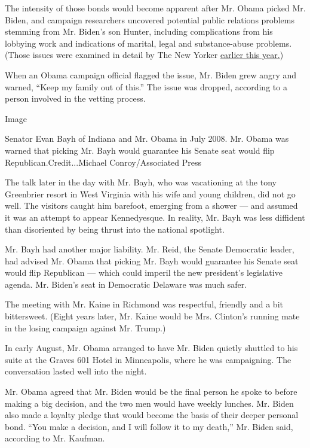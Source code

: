 The intensity of those bonds would become apparent after Mr. Obama
picked Mr. Biden, and campaign researchers uncovered potential public
relations problems stemming from Mr. Biden's son Hunter, including
complications from his lobbying work and indications of marital, legal
and substance-abuse problems. (Those issues were examined in detail by
The New Yorker
\href{https://www.newyorker.com/magazine/2019/07/08/will-hunter-biden-jeopardize-his-fathers-campaign}{earlier
this year.})

When an Obama campaign official flagged the issue, Mr. Biden grew angry
and warned, ``Keep my family out of this.'' The issue was dropped,
according to a person involved in the vetting process.

Image

Senator Evan Bayh of Indiana and Mr. Obama in July 2008. Mr. Obama was
warned that picking Mr. Bayh would guarantee his Senate seat would flip
Republican.Credit...Michael Conroy/Associated Press

The talk later in the day with Mr. Bayh, who was vacationing at the tony
Greenbrier resort in West Virginia with his wife and young children, did
not go well. The visitors caught him barefoot, emerging from a shower
--- and assumed it was an attempt to appear Kennedyesque. In reality,
Mr. Bayh was less diffident than disoriented by being thrust into the
national spotlight.

Mr. Bayh had another major liability. Mr. Reid, the Senate Democratic
leader, had advised Mr. Obama that picking Mr. Bayh would guarantee his
Senate seat would flip Republican --- which could imperil the new
president's legislative agenda. Mr. Biden's seat in Democratic Delaware
was much safer.

The meeting with Mr. Kaine in Richmond was respectful, friendly and a
bit bittersweet. (Eight years later, Mr. Kaine would be Mrs. Clinton's
running mate in the losing campaign against Mr. Trump.)

In early August, Mr. Obama arranged to have Mr. Biden quietly shuttled
to his suite at the Graves 601 Hotel in Minneapolis, where he was
campaigning. The conversation lasted well into the night.

Mr. Obama agreed that Mr. Biden would be the final person he spoke to
before making a big decision, and the two men would have weekly lunches.
Mr. Biden also made a loyalty pledge that would become the basis of
their deeper personal bond. ``You make a decision, and I will follow it
to my death,'' Mr. Biden said, according to Mr. Kaufman.

